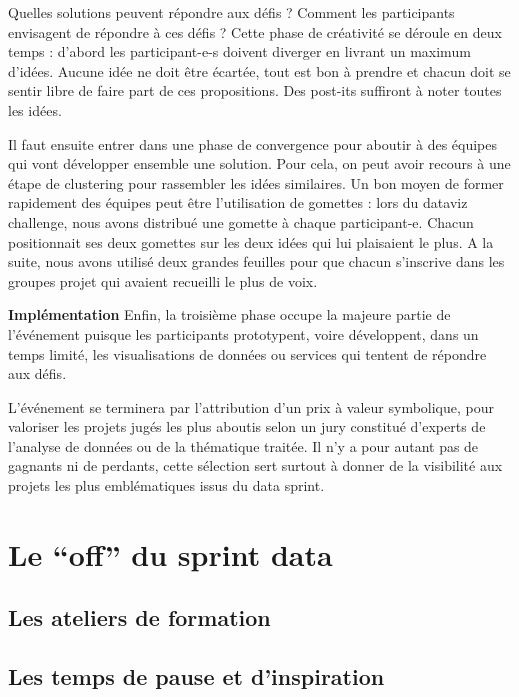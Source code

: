\documentclass[]{book}
\begin{document}
Quelles solutions peuvent répondre aux défis ? Comment les participants
envisagent de répondre à ces défis ? Cette phase de créativité se
déroule en deux temps : d'abord les participant-e-s doivent diverger en
livrant un maximum d'idées. Aucune idée ne doit être écartée, tout est
bon à prendre et chacun doit se sentir libre de faire part de ces
propositions. Des post-its suffiront à noter toutes les idées.

Il faut ensuite entrer dans une phase de convergence pour aboutir à des
équipes qui vont développer ensemble une solution. Pour cela, on peut
avoir recours à une étape de clustering pour rassembler les idées
similaires. Un bon moyen de former rapidement des équipes peut être
l'utilisation de gomettes : lors du dataviz challenge, nous avons
distribué une gomette à chaque participant-e. Chacun positionnait ses
deux gomettes sur les deux idées qui lui plaisaient le plus. A la suite,
nous avons utilisé deux grandes feuilles pour que chacun s'inscrive dans
les groupes projet qui avaient recueilli le plus de voix.

\textbf{Implémentation} Enfin, la troisième phase occupe la majeure
partie de l'événement puisque les participants prototypent, voire
développent, dans un temps limité, les visualisations de données ou
services qui tentent de répondre aux défis.

L'événement se terminera par l'attribution d'un prix à valeur
symbolique, pour valoriser les projets jugés les plus aboutis selon un
jury constitué d'experts de l'analyse de données ou de la thématique
traitée. Il n'y a pour autant pas de gagnants ni de perdants, cette
sélection sert surtout à donner de la visibilité aux projets les plus
emblématiques issus du data sprint.

\section{\texorpdfstring{Le ``off'' du sprint
data}{Le off du sprint data}}\label{le-off-du-sprint-data}

\subsection{Les ateliers de formation}\label{les-ateliers-de-formation}

\subsection{Les temps de pause et
d'inspiration}\label{les-temps-de-pause-et-dinspiration}
\end{document}
